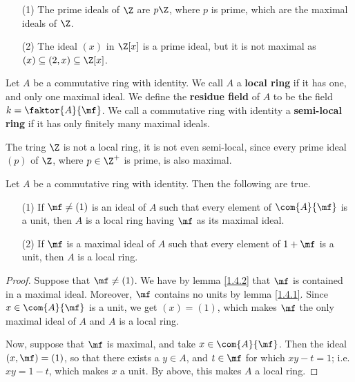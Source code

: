 \begin{example}\label{1.17}
    \begin{enumerate}
        \item[(1)] The prime ideals of $\Z$ are $p\Z$, where $p$ is prime, which
            are the maximal ideals of $\Z$.

        \item[(2)] The ideal $(x)$ in $\Z[x]$ is a prime ideal, but it is not
            maximal as $(x) \subseteq (2,x) \subseteq \Z[x]$.
    \end{enumerate}
\end{example}

\begin{definition}
    Let $A$ be a commutative ring with identity. We call $A$ a \textbf{local
    ring} if it has one, and only one maximal ideal. We define the
    \textbf{residue field} of $A$ to be the field  $k=\faktor{A}{\mf}$. We call
    a commutative ring with identity a \textbf{semi-local ring} if it has only
    finitely many maximal ideals.
\end{definition}

\begin{example}\label{example_1.6}
    The tring $\Z$ is not a local ring, it is not even semi-local, since every
    prime ideal $(p)$ of $\Z$, where  $p \in \Z^+$ is prime, is also maximal.
\end{example}

\begin{lemma}\label{1.4.5}
    Let $A$ be a commutative ring with identity. Then the following are true.
    \begin{enumerate}
        \item[(1)] If $\mf \neq (1)$ is an ideal of $A$ such that every
            element of $\com{A}{\mf}$ is a unit, then $A$ is a local ring having
             $\mf$ as its maximal ideal.

         \item[(2)] If $\mf$ is a maximal ideal of $A$ such that every element
             of $1+\mf$ is a unit, then $A$ is a local ring.
    \end{enumerate}
\end{lemma}
\begin{proof}
    Suppose that $\mf \neq (1)$. We have by lemma \ref{1.4.2} that $\mf$ is
    contained in a maximal ideal. Moreover, $\mf$ contains no units by lemma
    \ref{1.4.1}. Since $x \in \com{A}{\mf}$ is a unit, we get $(x)=(1)$, which
    makes $\mf$ the only maximal ideal of  $A$ and $A$ is a local ring.

    Now, suppose that $\mf$ is maximal, and take $x \in \com{A}{\mf}$. Then the
    ideal $(x,\mf)=(1)$, so that there exists a $y \in A$, and $t \in \mf$ for
    which $xy-t=1$; i.e.  $xy=1-t$, which makes $x$ a unit. By above, this makes
    $A$ a local ring.
\end{proof}
